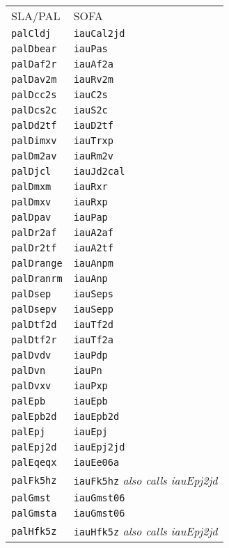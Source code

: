 \documentclass[twoside,11pt]{article}
\renewcommand{\_}{\texttt{\symbol{95}}}
\begin{document}
\begin{tabular}{ll}
SLA/PAL &  SOFA \\
\texttt{palCldj} & \texttt{iauCal2jd} \\
\texttt{palDbear} & \texttt{iauPas} \\
\texttt{palDaf2r} & \texttt{iauAf2a} \\
\texttt{palDav2m} &  \texttt{iauRv2m} \\
\texttt{palDcc2s} &  \texttt{iauC2s} \\
\texttt{palDcs2c} & \texttt{iauS2c} \\
\texttt{palDd2tf} & \texttt{iauD2tf}\\
\texttt{palDimxv} & \texttt{iauTrxp}\\
\texttt{palDm2av} & \texttt{iauRm2v}\\
\texttt{palDjcl} & \texttt{iauJd2cal}\\
\texttt{palDmxm} & \texttt{iauRxr}\\
\texttt{palDmxv} & \texttt{iauRxp}\\
\texttt{palDpav} & \texttt{iauPap}\\
\texttt{palDr2af} & \texttt{iauA2af}\\
\texttt{palDr2tf} & \texttt{iauA2tf}\\
\texttt{palDrange} & \texttt{iauAnpm}\\
\texttt{palDranrm} & \texttt{iauAnp}\\
\texttt{palDsep} & \texttt{iauSeps}\\
\texttt{palDsepv} & \texttt{iauSepp}\\
\texttt{palDtf2d} & \texttt{iauTf2d}\\
\texttt{palDtf2r} & \texttt{iauTf2a}\\
\texttt{palDvdv} & \texttt{iauPdp}\\
\texttt{palDvn} & \texttt{iauPn}\\
\texttt{palDvxv} & \texttt{iauPxp}\\
\texttt{palEpb} & \texttt{iauEpb}\\
\texttt{palEpb2d} & \texttt{iauEpb2d}\\
\texttt{palEpj} & \texttt{iauEpj}\\
\texttt{palEpj2d} & \texttt{iauEpj2jd}\\
\texttt{palEqeqx} & \texttt{iauEe06a}\\
\texttt{palFk5hz} & \texttt{iauFk5hz} \textit{also calls iauEpj2jd}\\
\texttt{palGmst} & \texttt{iauGmst06}\\
\texttt{palGmsta} & \texttt{iauGmst06}\\
\texttt{palHfk5z} & \texttt{iauHfk5z} \textit{also calls iauEpj2jd}\\
\end{tabular}
\end{document}
